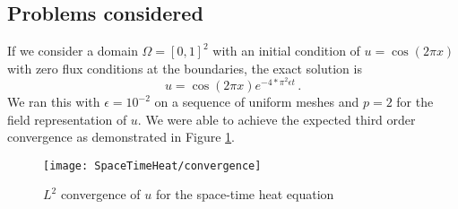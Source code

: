 \documentclass[Dissertation.tex]{subfiles}
\begin{document}

\subsection{Problems considered}
If we consider a domain $\Omega=[0,1]^2$ with an initial condition of $u=\cos(2\pi x)$ with zero flux conditions at the boundaries,
the exact solution is
\begin{equation*}
	u=\cos(2\pi x)e^{-4*\pi^2\epsilon t}\,.
\end{equation*}
We ran this with $\epsilon=10^{-2}$ on a sequence of uniform meshes and $p=2$ for the field representation of $u$. 
We were able to achieve the expected third order convergence as demonstrated in Figure \ref{fig:spaceTimeHeatConvergence}.

\begin{figure}[!ht]
	\centering
	\texttt{[image: SpaceTimeHeat/convergence]}
	\caption{$L^2$ convergence of $u$ for the space-time heat equation}
	\label{fig:spaceTimeHeatConvergence}
\end{figure}
\end{document}
